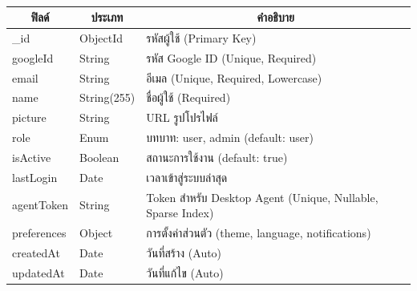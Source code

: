 \begin{table}[H]
    \caption{}
    \label{tab:user-structure}
    \fontSixTeen 
    \begin{tabularx}{\textwidth}{|l|l|X|} 
        \hline
        \multicolumn{1}{|c|}{\textbf{ฟิลด์}} & \multicolumn{1}{c|}{\textbf{ประเภท}} & \multicolumn{1}{c|}{\textbf{คำอธิบาย}} \\
        \hline
        \_id & ObjectId & รหัสผู้ใช้ (Primary Key) \\
        \hline
        googleId & String & รหัส Google ID (Unique, Required) \\
        \hline
        email & String & อีเมล (Unique, Required, Lowercase) \\
        \hline
        name & String(255) & ชื่อผู้ใช้ (Required) \\
        \hline
        picture & String & URL รูปโปรไฟล์ \\
        \hline
        role & Enum & บทบาท: user, admin (default: user) \\
        \hline
        isActive & Boolean & สถานะการใช้งาน (default: true) \\
        \hline
        lastLogin & Date & เวลาเข้าสู่ระบบล่าสุด \\
        \hline
        agentToken & String & Token สำหรับ Desktop Agent (Unique, Nullable, Sparse Index) \\
        \hline
        preferences & Object & การตั้งค่าส่วนตัว (theme, language, notifications) \\
        \hline
        createdAt & Date & วันที่สร้าง (Auto) \\
        \hline
        updatedAt & Date & วันที่แก้ไข (Auto) \\
        \hline
    \end{tabularx}
\end{table}


